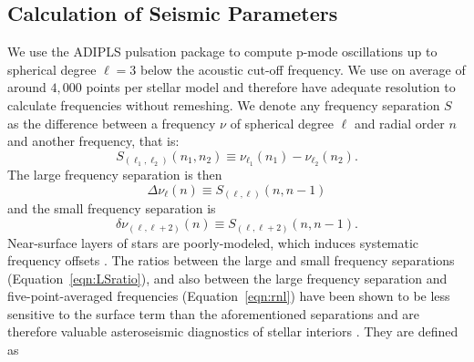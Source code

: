 

\subsection{Calculation of Seismic Parameters}
\label{sec:seis}
We use the ADIPLS pulsation package \citep{2008Ap&SS.316..113C} to compute p-mode oscillations up to spherical degree ${\ell=3}$ below the acoustic cut-off frequency. We use on average of around $4,000$ points per stellar model and therefore have adequate resolution to calculate frequencies without remeshing. We denote any frequency separation $S$ as the difference between a frequency $\nu$ of spherical degree $\ell$ and radial order $n$ and another frequency, that is: 
\begin{equation} 
  S_{(\ell_1, \ell_2)}(n_1, n_2) \equiv \nu_{\ell_1}(n_1) - \nu_{\ell_2}(n_2).
\end{equation}
The large frequency separation is then
\begin{equation} 
  \Delta\nu_\ell(n) \equiv S_{(\ell, \ell)}(n, n-1)
\end{equation}
and the small frequency separation is
\begin{equation}
  \delta\nu_{(\ell, \ell+2)}(n) \equiv S_{(\ell, \ell+2)}(n, n-1).
\end{equation}
Near-surface layers of stars are poorly-modeled, which induces systematic frequency offsets \citep[see e.g.][]{1999A&A...351..689R}. The ratios between the large and small frequency separations (Equation~\ref{eqn:LSratio}), and also between the large frequency separation and five-point-averaged frequencies (Equation~\ref{eqn:rnl}) have been shown to be less sensitive to the surface term than the aforementioned separations and are therefore valuable asteroseismic diagnostics of stellar interiors \citep{2003A&A...411..215R}. They are defined as
